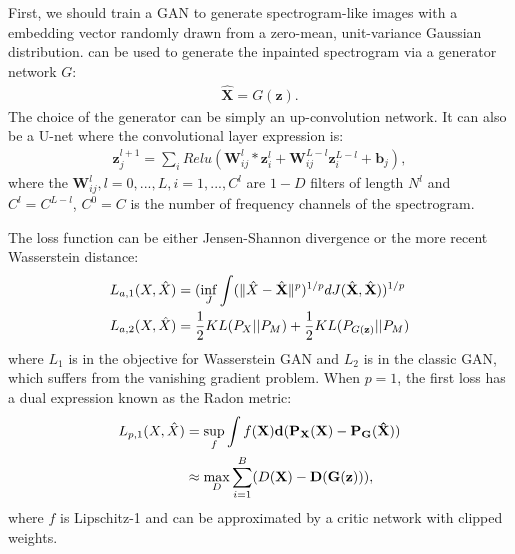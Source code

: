 \documentclass[a4paper]{article}
\begin{document}
First, we should train a GAN to generate spectrogram-like images with 
a embedding vector randomly drawn from a zero-mean, unit-variance Gaussian distribution.
can be used to generate the inpainted spectrogram via a generator network $G$:
\begin{align}
    \hat{\mathbf{X}} = G(\mathbf{z}).
\end{align}
The choice of the generator can
be simply an up-convolution network. It can also be a U-net \cite{Ronneberger15} where the
convolutional layer expression is:
\begin{align}
    \mathbf{z}^{l+1}_{j} =
\sum_{i} Relu(\mathbf{W}_{ij}^{l} * \mathbf{z}^{l}_i + \mathbf{W}_{ij}^{L-l} \mathbf{z}^{L-l}_i + \mathbf{b}_j),
\end{align}
where the $\mathbf{W}_{ij}^{l}, l=0, ..., L, i=1, ..., C^{l}$
are $1-D$ filters of length $N^l$ and $C^{l} = C^{L - l}$, $C^0 = C$
is the number of frequency channels of the spectrogram.

The loss function can be either Jensen-Shannon divergence or the more recent Wasserstein distance:
\begin{align}
\label{eq:adv_losses}
    L_{a, 1}(X, \hat{X}) &= (\inf_J \int(\lVert \hat{X} - \hat{\bf{X}}\rVert ^p)^{1/p}dJ(\hat{\bf{X}}, \hat{\bf{X}}))^{1/p}\\
    L_{a, 2}(X, \hat{X}) &= \frac{1}{2}KL(P_X || P_M) +  \frac{1}{2} KL(P_{G(\bf{z})} || P_M)
\end{align}
 where $L_1$ is in the objective for Wasserstein GAN \cite{Arjovsky17} and
 $L_2$ is in the classic GAN, which suffers from the vanishing
 gradient problem. When $p=1$, the first loss has 
 a dual expression known as the Radon metric:
 \begin{align}
    L_{p, 1}(X, \hat{X}) &= \sup_f \int f(\bf{X}) d(P_{\bf{X}}(\bf{X}) - P_{G}(\hat{\bf{X}}))\\
    &\approx \max_D \sum_{i=1}^{B} (D(\bf{X}) - D(G(\bf{z}))),
 \end{align}
where $f$ is Lipschitz-1 and can be approximated by a critic network
with clipped weights.  
\end{document}
